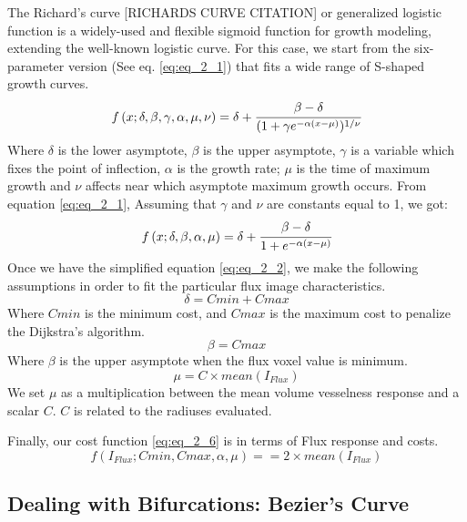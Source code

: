 The Richard's curve [RICHARDS CURVE CITATION] or generalized logistic function is a widely-used and flexible sigmoid function for growth modeling, extending the well-known logistic curve. For this case, we start from the six-parameter version (See eq. \ref{eq:eq_2_1}) that fits a wide range of S-shaped growth curves. 
\begin{equation}
\label{eq:eq_2_1}
f\left( x;\delta,\beta,\gamma,\alpha,\mu,\nu\right) = \delta + \cfrac{\beta-\delta}{(1+\gamma e^{-\alpha(x-\mu)})^{1/\nu}}
\end{equation}
Where $\delta$ is the lower asymptote, $\beta$ is the upper asymptote, $\gamma$ is a variable which fixes the point of inflection, $\alpha$ is the growth rate; $\mu$ is the time of maximum growth and $\nu$ affects near which asymptote maximum growth occurs.
From equation \ref{eq:eq_2_1}, Assuming that $\gamma$ and $\nu$ are constants equal to 1, we got:
\begin{equation}
\label{eq:eq_2_2}
f\left( x;\delta,\beta,\alpha,\mu\right) = \delta + \cfrac{\beta-\delta}{1+e^{-\alpha(x-\mu)}}
\end{equation}
Once we have the simplified equation \ref{eq:eq_2_2}, we make the following assumptions in order to fit the particular flux image characteristics.
\begin{equation}
\label{eq:eq_2_3}
\delta = Cmin + Cmax
\end{equation}
Where $Cmin$ is the minimum cost, and $Cmax$ is the maximum cost to penalize the Dijkstra's algorithm. 
\begin{equation}
\label{eq:eq_2_4}
\beta = Cmax
\end{equation}
Where $\beta$ is the upper asymptote when the flux voxel value is minimum.
\begin{equation}
\label{eq:eq_2_5}
\mu = C \times mean(I_{Flux}) 
\end{equation}
We set $\mu$ as a multiplication between the mean volume vesselness response and a scalar $C$. $C$ is related to the radiuses evaluated.

Finally, our cost function \ref{eq:eq_2_6} is in terms of Flux response and costs.
\begin{equation}
\label{eq:eq_2_6}
f( I_{Flux};Cmin, Cmax, \alpha,\mu) == 2\times mean(I_{Flux}) 
\end{equation}


\subsection{Dealing with Bifurcations: Bezier's Curve}

